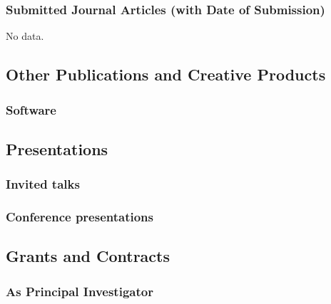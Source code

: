 \begin{adjustwidth}{2em}{0pt}
\newrefcontext[labelprefix=O]
\printbibliography[resetnumbers=true,filter=other,heading=none]

\subsubsection{Submitted Journal Articles (with Date of Submission)}
\newrefcontext[labelprefix=U]
\printbibliography[type=unpublished,resetnumbers=true,heading=none]

No data.

\subsection{Other Publications and Creative Products}

\subsubsection{Software}

\newrefcontext[labelprefix=S]
\printbibliography[type=software,resetnumbers=true,heading=none]

\subsection{Presentations}

\subsubsection{Invited talks}
\newrefcontext[labelprefix=I]
\printbibliography[resetnumbers=true,filter=invited,heading=none]

\subsubsection{Conference presentations}
\newrefcontext[labelprefix=T]
\printbibliography[resetnumbers=true,filter=talk,heading=none]

\subsection{Grants and Contracts}

\subsubsection{As Principal Investigator}

\iffalse
\begin{itemize}
    \item
    Title of Project: \\
    Agency/Company: \\
    Total Dollar Amount:  \\
    Role: co-PI or PI \\
    Collaborators: Georgette Burdell (PI), Jane Doe (co-PI), John Doe (co-PI) \\
    Period of Contract: 7/1/2008 – 6/31/2010 \\
    Candidate’s Share: ~25\% (\$250K)
\end{itemize}
\fi


\end{adjustwidth}
